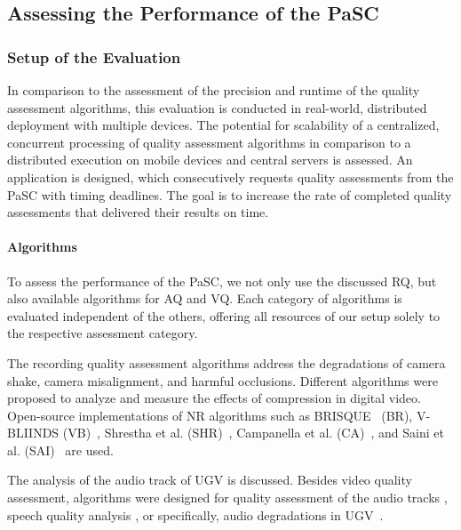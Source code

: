 \subsection{Assessing the Performance of the PaSC}
\label{556:Assessment_Eval}
\subsubsection{Setup of the Evaluation}
\label{sec:557_eval_setup}
In comparison to the assessment of the precision and runtime of the quality assessment algorithms, this evaluation is conducted in real-world, distributed deployment with multiple devices. 
The potential for scalability of a centralized, concurrent processing of quality assessment algorithms in comparison to a distributed execution on mobile devices and central servers is assessed.
An application is designed, which consecutively requests quality assessments from the \ac{PaSC} with timing deadlines.
The goal is to increase the rate of completed quality assessments that delivered their results on time.
\paragraph{Algorithms}
To assess the performance of the \ac{PaSC}, we not only use the discussed \ac{RQ}, but also available algorithms for \ac{AQ} and \ac{VQ}.
Each category of algorithms is evaluated independent of the others, offering all resources of our setup solely to the respective assessment category.

The recording quality assessment algorithms address the degradations of camera shake, camera misalignment, and harmful occlusions.
Different algorithms were proposed to analyze and measure the effects of compression in digital video.
Open-source implementations of \ac{NR} algorithms such as BRISQUE~\cite{Mittal2011} (BR), V-BLIINDS (VB)~\cite{Saad2014}, Shrestha et al. (SHR)~\cite{Shrestha2010}, Campanella et al. (CA)~\cite{Campanella2007}, and Saini et al. (SAI)~\cite{Saini2012} are used. 

The analysis of the audio track of \ac{UGV} is discussed.
Besides video quality assessment, algorithms were designed for quality assessment of the audio tracks \cite{ITU-P863}, speech quality analysis \cite{ITU-P563}, 
or specifically, audio degradations in \ac{UGV}~\cite{Li2013}.
